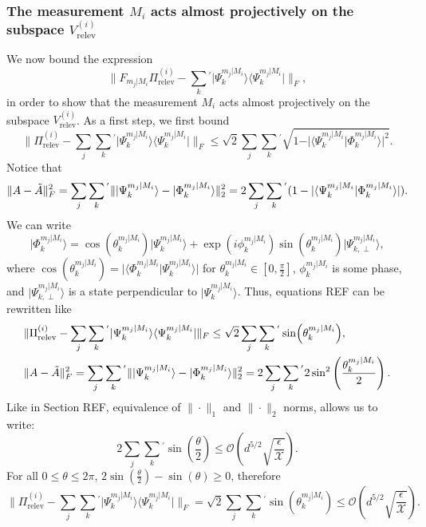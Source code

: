 \subsubsection{The measurement $M_i$ acts almost projectively on the subspace $V_{\text{relev}}^{(i)}$}
We now bound the expression
\begin{equation}
\|F_{m_j\vert M_i}\Pi_{\text{relev}}^{(i)}-\sum_{k}{}^{'}\vert \Psi_k^{m_j\vert M_i}\rangle \langle \Psi_k^{m_j\vert M_i}\vert \|_F,
\end{equation}
in order to show that the measurement $M_i$ acts almost projectively on the subspace $V_{\text{relev}}^{(i)}$. As a first step, we first bound
\begin{equation}
\|\Pi_{\text{relev}}^{(i)}-\sum_j\sum_k{}^{'}\vert \Psi_k^{m_j\vert M_i}\rangle \langle \Psi_k^{m_j\vert M_i}\vert \|_F\leq\sqrt{2}\sum_j\sum_k{}^{'}\sqrt{1-\vert \langle \Psi_k^{m_j\vert M_i} \vert \Phi_k^{m_j\vert M_i} \rangle \vert^2}.
\end{equation}
Notice that
\begin{equation}
\|A-\Tilde{A}\|_F^2=\sum_j\sum_k{}^{'}\|\vert \Psi_k^{m_j\vert M_i} \rangle - \vert \Phi_k^{m_j\vert M_i}\rangle\|_2^2=2\sum_j\sum_k{}^{'}(1-\vert\langle \Psi_k^{m_j\vert M_i} \vert \Phi_k^{m_j\vert M_i} \rangle \vert).
\end{equation}
We can write 
\begin{equation}
\vert \Phi_k^{m_j\vert M_i}\rangle = \cos(\theta_k^{m_j\vert M_i})\vert \Psi_k^{m_j\vert M_i}\rangle + \exp(i\phi_k^{m_j\vert M_i})\sin(\theta_k^{m_j\vert M_i})\vert \Psi_{k,\perp}^{m_j\vert M_i} \rangle, 
\end{equation}
where $\cos(\theta_k^{m_j\vert M_i})= \vert\langle \Phi_k^{m_j\vert M_i}\vert\Psi_k^{m_j\vert M_i} \rangle\vert$ for $\theta_k^{m_j\vert M_i}\in[0,\frac{\pi}{2}]$, $\phi_k^{m_j\vert M_i}$ is some phase, and $\vert \Psi_{k,\perp}^{m_j\vert M_i} \rangle$ is a state perpendicular to $\vert \Psi_k^{m_j\vert M_i}\rangle$.
Thus, equations REF can be rewritten like
\begin{align}
& \|\Pi_{\text{relev}}^{(i)}-\sum_j\sum_k{}^{'}\vert \Psi_k^{m_j\vert M_i}\rangle \langle \Psi_k^{m_j\vert M_i}\vert \|_F\leq\sqrt{2}\sum_j\sum_k{}^{'}\sin(\theta_k^{m_j\vert M_i}), \\
& \|A-\Tilde{A}\|_F^2=\sum_j\sum_k{}^{'}\|\vert \Psi_k^{m_j\vert M_i} \rangle - \vert \Phi_k^{m_j\vert M_i}\rangle\|_2^2=2\sum_j\sum_k{}^{'}2\sin^2\left(\frac{\theta_k^{m_j\vert M_i}}{2}\right).
\end{align}
Like in Section REF, equivalence of $\|\cdot\|_1$ and $\|\cdot\|_2$ norms, allows us to write:
\begin{equation}
2\sum_j\sum_k{}^{'}\sin\left(\frac{\theta}{2}\right)\leq \mathcal{O}\left(d^{5/2}\sqrt{\frac{\epsilon}{\mathcal{X}}}\right).
\end{equation}
For all $0\leq \theta \leq 2\pi$, $2\sin(\frac{\theta}{2})-\sin(\theta)\geq 0$, therefore
\begin{equation}
\|\Pi_{\text{relev}}^{(i)}-\sum_j\sum_k{}^{'}\vert \Psi_k^{m_j\vert M_i}\rangle \langle \Psi_k^{m_j\vert M_i}\vert \|_F = \sqrt{2}\sum_j\sum_k{}^{'}\sin(\theta_k^{m_j\vert M_i})\leq\mathcal{O}\left(d^{5/2}\sqrt{\frac{\epsilon}{\mathcal{X}}}\right).
\end{equation}